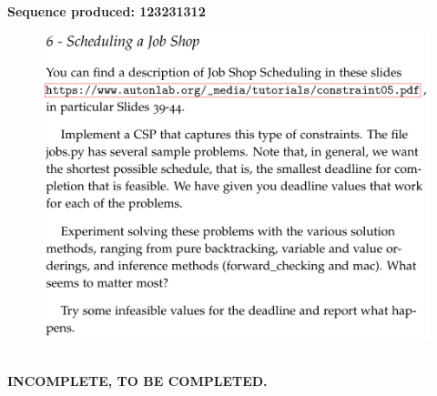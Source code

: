 \documentclass[12pt]{article}
\newenvironment{solution}[2][Solution]{\begin{trivlist}
\item[\hskip \labelsep {\bfseries #1}]}{\end{trivlist}}
\begin{document}
\begin{solution}{}~\\



\textbf{Sequence produced: 123231312}
\end{solution}

\begin{figure}[h!]
\includegraphics[width=\linewidth]{./assets/201807261951.png}
\end{figure}
\pagebreak
\begin{solution}{}~\\
\textbf{INCOMPLETE, TO BE COMPLETED.}
\end{solution}

%
\end{document}
